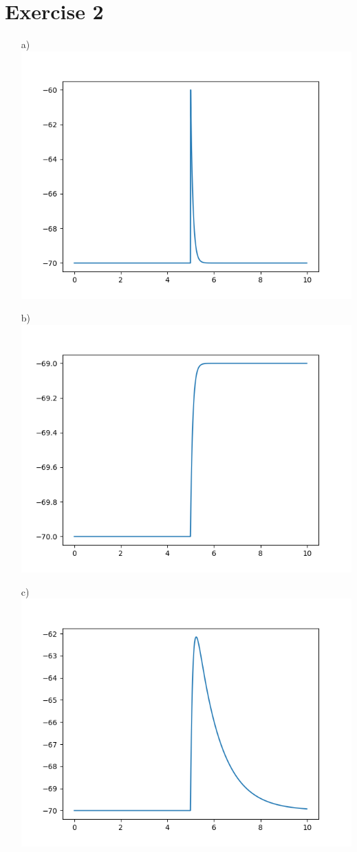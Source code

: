 \documentclass[a4paper]{article}
\begin{document}
\section*{Exercise 2}
\begin{itemize}
    \item[a)] \includegraphics{a.png}
    \item[b)] \includegraphics{b.png}
    \item[c)] \includegraphics{c.png}
\end{itemize}
\end{document}
